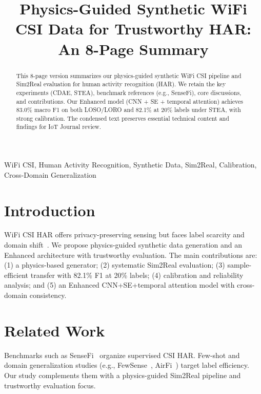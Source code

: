 \documentclass[journal]{IEEEtran}
\begin{document}
\title{Physics-Guided Synthetic WiFi CSI Data for Trustworthy HAR: An 8-Page Summary}

\author{
}

\maketitle

\begin{abstract}
This 8-page version summarizes our physics-guided synthetic WiFi CSI pipeline and Sim2Real evaluation for human activity recognition (HAR). We retain the key experiments (CDAE, STEA), benchmark references (e.g., SenseFi), core discussions, and contributions. Our Enhanced model (CNN + SE + temporal attention) achieves 83.0\% macro F1 on both LOSO/LORO and 82.1\% at 20\% labels under STEA, with strong calibration. The condensed text preserves essential technical content and findings for IoT Journal review.
\end{abstract}

\begin{IEEEkeywords}
WiFi CSI, Human Activity Recognition, Synthetic Data, Sim2Real, Calibration, Cross-Domain Generalization
\end{IEEEkeywords}

\section{Introduction}
WiFi CSI HAR offers privacy-preserving sensing but faces label scarcity and domain shift~\cite{yang2023sensefi}. We propose physics-guided synthetic data generation and an Enhanced architecture with trustworthy evaluation. The main contributions are: (1) a physics-based generator; (2) systematic Sim2Real evaluation; (3) sample-efficient transfer with 82.1\% F1 at 20\% labels; (4) calibration and reliability analysis; and (5) an Enhanced CNN+SE+temporal attention model with cross-domain consistency.

\section{Related Work}
Benchmarks such as SenseFi~\cite{yang2023sensefi} organize supervised CSI HAR. Few-shot and domain generalization studies (e.g., FewSense~\cite{fewsense2022}, AirFi~\cite{airfi2022}) target label efficiency. Our study complements them with a physics-guided Sim2Real pipeline and trustworthy evaluation focus.
\end{document}
